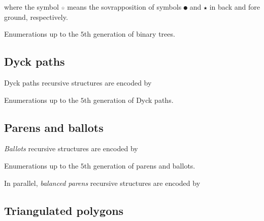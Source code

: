 \begin{margintable}
where the symbol \verb|☆| means the sovrapposition of symbols \verb|●| and
\verb|★| in back and fore ground, respectively.
\caption{Enumerations up to the $5$th generation of binary trees.}
\end{margintable}

\newpage
\subsection{Dyck paths}

Dyck paths recursive structures are encoded by


\begin{margintable}
\caption{Enumerations up to the $5$th generation of Dyck paths.}
\end{margintable}

\newpage
\subsection{Parens and ballots}

\textit{Ballots} recursive structures are encoded by


\begin{margintable}
\caption{Enumerations up to the $5$th generation of parens and ballots.}
\end{margintable}

In parallel, \textit{balanced parens} recursive structures are encoded by



\newpage
\subsection{Triangulated polygons}

